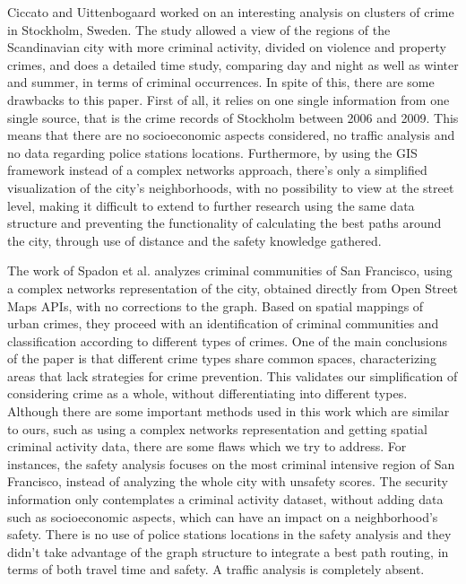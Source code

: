 \documentclass[runningheads]{llncs}
\begin{document}
Ciccato and Uittenbogaard \cite{ceccato_space-time_2012} worked on an interesting analysis on clusters of crime in Stockholm, Sweden. The study allowed a view of the regions of the Scandinavian city with more criminal activity, divided on violence and property crimes, and does a detailed time study, comparing day and night as well as winter and summer, in terms of criminal occurrences. In spite of this, there are some drawbacks to this paper. First of all, it relies on one single information from one single source, that is the crime records of Stockholm between 2006 and 2009. This means that there are no socioeconomic aspects considered, no traffic analysis and no data regarding police stations locations. Furthermore, by using the GIS framework instead of a complex networks approach, there's only a simplified visualization of the city's neighborhoods, with no possibility to view at the street level, making it difficult to extend to further research using the same data structure and preventing the functionality of calculating the best paths around the city, through use of distance and the safety knowledge gathered.

The work of Spadon et al. \cite{spadon_complex_2016} analyzes criminal communities of San Francisco, using a complex networks representation of the city, obtained directly from Open Street Maps \cite{noauthor_open_nodate} APIs, with no corrections to the graph. Based on spatial mappings of urban crimes, they proceed with an identification of criminal communities and classification according to different types of crimes. One of the main conclusions of the paper is that different crime types share common spaces, characterizing areas that lack strategies for crime prevention. This validates our simplification of considering crime as a whole, without differentiating into different types. Although there are some important methods used in this work which are similar to ours, such as using a complex networks representation and getting spatial criminal activity data, there are some flaws which we try to address. For instances, the safety analysis focuses on the most criminal intensive region of San Francisco, instead of analyzing the whole city with unsafety scores. The security information only contemplates a criminal activity dataset, without adding data such as socioeconomic aspects, which can have an impact on a neighborhood's safety. There is no use of police stations locations in the safety analysis and they didn't take advantage of the graph structure to integrate a best path routing, in terms of both travel time and safety. A traffic analysis is completely absent.
\end{document}
